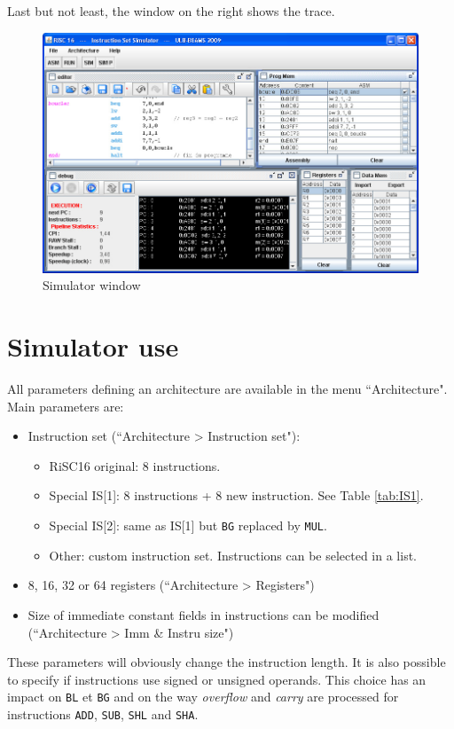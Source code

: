 \documentclass[10pt,a4paper]{article}
\theoremstyle{definition}%
\begin{document}
Last but not least, the window on the right shows the trace.
\begin{figure}[h!]
	\begin{center}
		\includegraphics[width=15cm]{100000000000035F000002289D31421E.jpg}
	\end{center}
\caption{Simulator window}
\label{fig:simulator}
\end{figure}

\newpage
\section{Simulator use}
All parameters defining an architecture are available in the menu ``Architecture". Main parameters are:
\begin{itemize}
\item Instruction set (``Architecture > Instruction set"):
\begin{itemize}
\item RiSC16 original: 8 instructions.
\item Special IS[1]: 8 instructions + 8 new instruction. See Table \vref{tab:IS1}.
\item Special IS[2]: same as IS[1] but \verb!BG! replaced by \verb!MUL!.
\item Other: custom instruction set. Instructions can be selected in a list.
\end{itemize}
\item 8, 16, 32 or 64 registers (``Architecture > Registers")
\item Size of immediate constant fields in instructions can be modified (``Architecture > Imm \& Instru size")
\end{itemize}
These parameters will obviously change the instruction length.
%
It is also possible to specify if instructions use signed or unsigned operands. This choice has an impact on \verb!BL! et \verb!BG! and on the way \textit{overflow} and \textit{carry} are processed for instructions \verb!ADD!, \verb!SUB!, \verb!SHL! and  \verb!SHA!.
\end{document}
